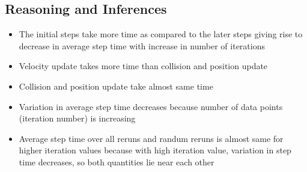 \documentclass[11pt]{article}
\begin{document}
\subsection{Reasoning and Inferences}
\begin{itemize}
\item The initial steps take more time as compared to the later steps giving rise to decrease in average step time with increase in number of iterations
\item Velocity update takes more time than collision and position update
\item Collision and position update take almost same time
\item Variation in average step time decreases because number of data points (iteration number) is increasing
\item Average step time over all reruns and randum reruns is almost same for higher iteration values because with high iteration value, variation in step time decreases, so both quantities lie near each other
\end{itemize}
\end{document}
